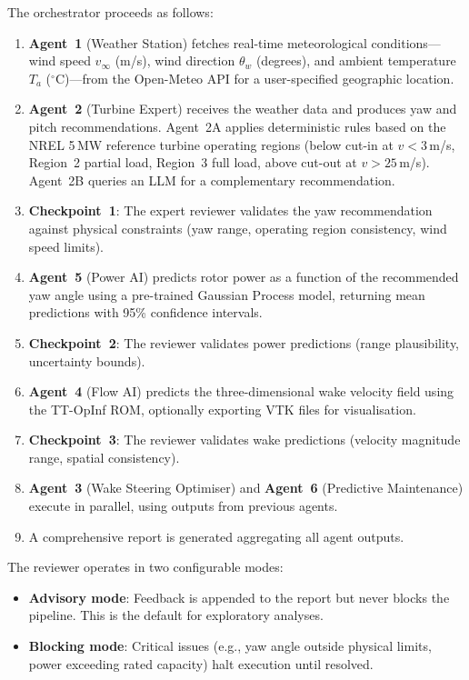 \documentclass[12pt]{article}
\begin{document}
The orchestrator proceeds as follows:
\begin{enumerate}[leftmargin=*]
    \item \textbf{Agent~1} (Weather Station) fetches real-time meteorological conditions---wind speed $v_\infty$ (m/s), wind direction $\theta_w$ (degrees), and ambient temperature $T_a$ ($^\circ$C)---from the Open-Meteo API for a user-specified geographic location.
    \item \textbf{Agent~2} (Turbine Expert) receives the weather data and produces yaw and pitch recommendations. Agent~2A applies deterministic rules based on the NREL 5\,MW reference turbine operating regions (below cut-in at $v < 3$\,m/s, Region~2 partial load, Region~3 full load, above cut-out at $v > 25$\,m/s). Agent~2B queries an LLM for a complementary recommendation.
    \item \textbf{Checkpoint~1}: The expert reviewer validates the yaw recommendation against physical constraints (yaw range, operating region consistency, wind speed limits).
    \item \textbf{Agent~5} (Power AI) predicts rotor power as a function of the recommended yaw angle using a pre-trained Gaussian Process model, returning mean predictions with 95\% confidence intervals.
    \item \textbf{Checkpoint~2}: The reviewer validates power predictions (range plausibility, uncertainty bounds).
    \item \textbf{Agent~4} (Flow AI) predicts the three-dimensional wake velocity field using the TT-OpInf ROM, optionally exporting VTK files for visualisation.
    \item \textbf{Checkpoint~3}: The reviewer validates wake predictions (velocity magnitude range, spatial consistency).
    \item \textbf{Agent~3} (Wake Steering Optimiser) and \textbf{Agent~6} (Predictive Maintenance) execute in parallel, using outputs from previous agents.
    \item A comprehensive report is generated aggregating all agent outputs.
\end{enumerate}

The reviewer operates in two configurable modes:
\begin{itemize}[leftmargin=*]
    \item \textbf{Advisory mode}: Feedback is appended to the report but never blocks the pipeline. This is the default for exploratory analyses.
    \item \textbf{Blocking mode}: Critical issues (e.g., yaw angle outside physical limits, power exceeding rated capacity) halt execution until resolved.
\end{itemize}
\end{document}
